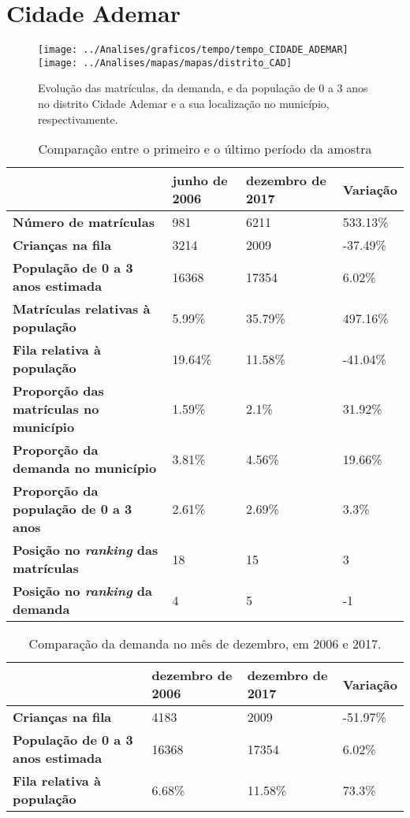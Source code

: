 \section{Cidade Ademar}
\begin{figure}[H]
	\centering
	\texttt{[image: ../Analises/graficos/tempo/tempo\_CIDADE\_ADEMAR]}
	\texttt{[image: ../Analises/mapas/mapas/distrito\_CAD]}
	\caption{Evolução das matrículas, da demanda, e da população de 0 a 3 anos no distrito Cidade Ademar e a sua localização no município, respectivamente.}
\end{figure}
\begin{table}[H]
	\begin{tabular}{|l|l|l|l|}
		\hline
		\textbf{}                                      & \textbf{junho de 2006}       & \textbf{dezembro de 2017}    & \textbf{Variação} \\ \hline
		\textbf{Número de matrículas}                  & 981 & 6211 & 533.13\% \\ \hline
		\textbf{Crianças na fila}                      & 3214 & 2009 & -37.49\% \\ \hline
		\textbf{População de 0 a 3 anos estimada}      & 16368 & 17354 & 6.02\% \\ \hline
		\textbf{Matrículas relativas à população}      & 5.99\% & 35.79\% & 497.16\% \\ \hline
		\textbf{Fila relativa à população}             & 19.64\% & 11.58\% & -41.04\% \\ \hline
		\textbf{Proporção das matrículas no município} & 1.59\% & 2.1\% & 31.92\% \\ \hline
		\textbf{Proporção da demanda no município}     & 3.81\% & 4.56\% & 19.66\% \\ \hline
		\textbf{Proporção da população de 0 a 3 anos}  & 2.61\% & 2.69\% & 3.3\% \\ \hline
		\textbf{Posição no \textit{ranking} das matrículas}     & 18 & 15 & 3 \\ \hline
		\textbf{Posição no \textit{ranking} da demanda}         & 4 & 5 & -1 \\ \hline
	\end{tabular}
	\caption{Comparação entre o primeiro e o último período da amostra}
\end{table}
\begin{table}[H]
	\begin{tabular}{|l|l|l|l|}
		\hline
		\textbf{}                                 & \textbf{dezembro de 2006} & \textbf{dezembro de 2017} & \textbf{Variação} \\ \hline
		\textbf{Crianças na fila}                      & 4183 & 2009 & -51.97\% \\ \hline
		\textbf{População de 0 a 3 anos estimada}      & 16368 & 17354 & 6.02\% \\ \hline
		\textbf{Fila relativa à população}             & 6.68\% & 11.58\% & 73.3\% \\ \hline
	\end{tabular}
	\caption{Comparação da demanda no mês de dezembro, em 2006 e 2017.}
\end{table}
